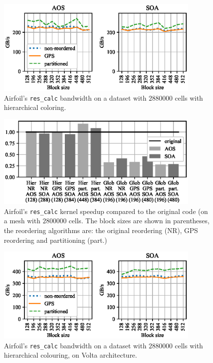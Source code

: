 \begin{figure}[Htbp]
\centering
\includegraphics[width=10cm]{fig/airfoil_bw-vs-bs_hier_large.eps}
\caption{Airfoil's \texttt{res\_calc} bandwidth on a dataset with $2880000$ 
cells with hierarchical coloring.}
\label{fig:airfoil_bw-vs-bs_hier_large}
\end{figure}

\begin{figure}[Htbp]
\centering
\includegraphics[width=10cm]{fig/airfoil_speedup_large.eps}
\caption{Airfoil's \texttt{res\_calc} kernel speedup compared to the original 
code (on a mesh with $2800000$ cells. The block sizes are shown in parentheses, 
the reordering algorithms are: the original reordering (NR), GPS reordering and 
partitioning (part.)}
\label{fig:airfoil_speedup_large}
\end{figure}



\begin{figure}[Htbp]
\centering
\includegraphics[width=10cm]{fig/airfoil_bw-vs-bs_hier_large_volta.eps}
\caption{Airfoil's \texttt{res\_calc} bandwidth on a dataset with $2880000$ 
cells with hierarchical colouring, on Volta architecture.} 
\label{fig:airfoil_bw-vs-bs_hier_large_volta}
\end{figure}

